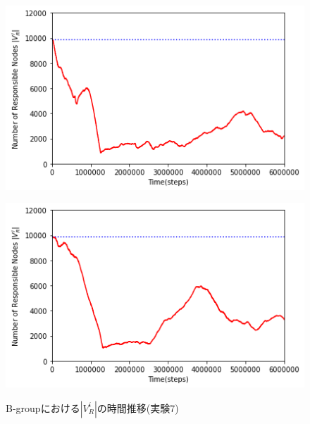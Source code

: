 \documentclass[12pt,a4j,twoside]{jarticle}
\begin{document}
  \begin{figure}
    \begin{minipage}{0.48\hsize}
      \centering
      \includegraphics[width=0.99\hsize]{figures/searchNum_Office_Bgroup_2.png}
      \label{subfig:search_Office_B_2}
    \end{minipage}
    \hfill
    \begin{minipage}{0.48\hsize}
      \centering
      \includegraphics[width=0.99\hsize]{figures/searchNum_Office_Bgroup_6.png}
      \label{subfig:search_Office_B_6}
    \end{minipage}
    \caption{B-groupにおける$|V^i_R|$の時間推移(実験7)}
    \label{fig:search_Office_B}
  \end{figure}
\end{document}
